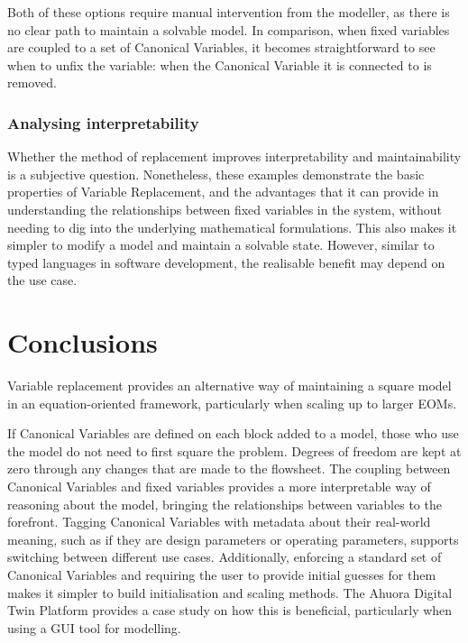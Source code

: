 Both of these options require manual intervention from the modeller, as
there is no clear path to maintain a solvable model. In comparison, when
fixed variables are coupled to a set of Canonical Variables, it becomes straightforward to
see when to unfix the variable: when the Canonical Variable it is connected to is
removed.

\hypertarget{analysing-interpretability}{%
\subsubsection{Analysing
interpretability}\label{analysing-interpretability}}

Whether the method of replacement improves interpretability and
maintainability is a subjective question. Nonetheless, these examples
demonstrate the basic properties of Variable Replacement, and the
advantages that it can provide in understanding the relationships
between fixed variables in the system, without needing to dig into the
underlying mathematical formulations. This also makes it simpler to
modify a model and maintain a solvable state. However, similar to typed
languages in software development, the realisable benefit may depend on
the use case.


\hypertarget{conclusion}{%
\section{Conclusions}\label{conclusion}}

Variable replacement provides an alternative way of maintaining a square
model in an equation-oriented framework, particularly when scaling up to
larger EOMs.

If Canonical Variables are defined on each block added to a model, those who
use the model do not need to first square the problem. Degrees of
freedom are kept at zero through any changes that are made to the
flowsheet. The coupling between Canonical Variables and fixed variables
provides a more interpretable way of reasoning about the model, bringing
the relationships between variables to the forefront. Tagging Canonical Variables
with metadata about their real-world meaning, such as if they are design parameters 
or operating parameters, supports switching between different use cases.
Additionally, enforcing a standard set of Canonical Variables and requiring the user
to provide initial guesses for them makes it simpler to
build initialisation and scaling methods. The Ahuora Digital Twin
Platform provides a case study on how this is beneficial, particularly
when using a GUI tool for modelling.

